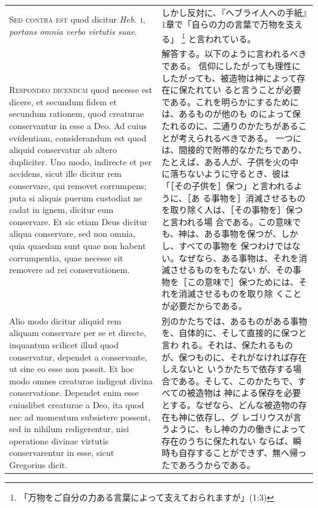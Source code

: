\documentclass[paper=a4paper,fontsize=10pt,jafontsize=9pt,titlepage]{jlreq}
\begin{document}
\begin{longtable}{p{21em}p{21em}}
\\


{\scshape  Sed contra est} quod dicitur {\itshape Heb}.~{\scshape i}, {\itshape portans
omnia verbo virtutis suae}.

&

しかし反対に、『ヘブライ人への手紙』1章で「自らの力の言葉で万物を支える」
 \footnote{「万物をご自分の力ある言葉によって支えておられますが」(1:3)}
 と言われている。
\\


{\scshape Respondeo dicendum} quod necesse est dicere,
et secundum fidem et secundum rationem, quod creaturae conservantur in
esse a Deo. Ad cuius evidentiam, considerandum est quod aliquid
conservatur ab altero dupliciter. Uno modo, indirecte et per accidens,
sicut ille dicitur rem conservare, qui removet corrumpens; puta si
aliquis puerum custodiat ne cadat in ignem, dicitur eum conservare. Et
sic etiam Deus dicitur aliqua conservare, sed non omnia, quia quaedam
sunt quae non habent corrumpentia, quae necesse sit removere ad rei
conservationem.


&

解答する。以下のように言われるべきである。
信仰にしたがっても理性にしたがっても、被造物は神によって存在に保たれてい
 ると言うことが必要である。これを明らかにするためには、あるものが他のも
 のによって保たれるのに、二通りのかたちがあることが考えられるべきである。
一つには、間接的で附帯的なかたちであり、たとえば、ある人が、子供を火の中
 に落ちないように守るとき、彼は「［その子供を］保つ」と言われるように、［あ
 る事物を］消滅させるものを取り除く人は、［その事物を］保つと言われる場
 合である。この意味でも、神は、ある事物を保つが、しかし、すべての事物を
 保つわけではない。なぜなら、ある事物は、それを消滅させるものをもたない
 が、その事物を［この意味で］保つためには、それを消滅させるものを取り除
 くことが必要だからである。

\\


Alio modo dicitur aliquid rem aliquam conservare per se
et directe, inquantum scilicet illud quod conservatur, dependet a
conservante, ut sine eo esse non possit. Et hoc modo omnes creaturae
indigent divina conservatione. Dependet enim esse cuiuslibet creaturae a
Deo, ita quod nec ad momentum subsistere possent, sed in nihilum
redigerentur, nisi operatione divinae virtutis conservarentur in esse,
sicut Gregorius dicit.


&

別のかたちでは、あるものがある事物を、自体的に、そして直接的に保つと言わ
 れる。それは、保たれるものが、保つものに、それがなければ存在しえないと
 いうかたちで依存する場合である。そして、このかたちで、すべての被造物は
 神による保存を必要とする。なぜなら、どんな被造物の存在も神に依存し、グ
 レゴリウスが言うように、もし神の力の働きによって存在のうちに保たれない
 ならば、瞬時も自存することができず、無へ帰ったであろうからである。


\end{longtable}
\end{document}
